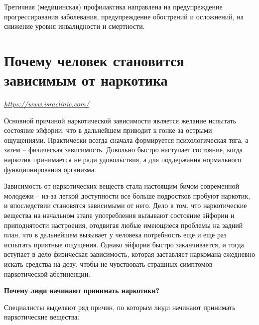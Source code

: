 Третичная (медицинская) профилактика направлена на предупреждение прогрессирования заболевания, предупреждение обострений и осложнений, на снижение уровня инвалидности и смертности.

\newpage
\section{Почему человек становится зависимым от наркотика}

 {\it \url{https://www.israclinic.com/}}

\begin{fancyquotes}
    Основной причиной наркотической зависимости является желание испытать состояние эйфории, что в дальнейшем приводит к гонке за острыми ощущениями. Практически всегда сначала формируется психологическая тяга, а затем – физическая зависимость. Довольно быстро наступает состояние, когда наркотик принимается не ради удовольствия, а для поддержания нормального функционирования организма.
\end{fancyquotes}

Зависимость от наркотических веществ стала настоящим бичом современной молодежи – из-за легкой доступности все больше подростков пробуют наркотик, и впоследствии становятся зависимыми от него. Дело в том, что наркотические вещества на начальном этапе употребления вызывают состояние эйфории и приподнятости настроения, отодвигая любые имеющиеся проблемы на задний план, что в дальнейшем вызывает у человека потребность еще и еще раз испытать приятные ощущения. Однако эйфория быстро заканчивается, и тогда вступает в дело физическая зависимость, которая заставляет наркомана ежедневно искать средства на дозу, чтобы не чувствовать страшных симптомов наркотической абстиненции.

\textbf{Почему люди начинают принимать наркотики?}

Специалисты выделяют ряд причин, по которым люди начинают принимать наркотические вещества:

